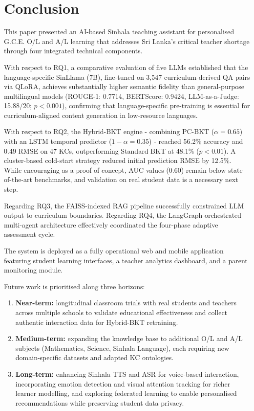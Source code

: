 \documentclass[conference]{IEEEtran}
\begin{document}
\section{Conclusion}

This paper presented an AI-based Sinhala teaching assistant for personalised G.C.E. O/L and A/L learning that addresses Sri Lanka's critical teacher shortage through four integrated technical components.

With respect to RQ1, a comparative evaluation of five LLMs established that the language-specific SinLlama (7B), fine-tuned on 3,547 curriculum-derived QA pairs via QLoRA, achieves substantially higher semantic fidelity than general-purpose multilingual models (ROUGE-1: 0.7714, BERTScore: 0.9424, LLM-as-a-Judge: 15.88/20; $p < 0.001$), confirming that language-specific pre-training is essential for curriculum-aligned content generation in low-resource languages.

With respect to RQ2, the Hybrid-BKT engine - combining PC-BKT ($\alpha = 0.65$) with an LSTM temporal predictor ($1 - \alpha = 0.35$) - reached 56.2\% accuracy and 0.49 RMSE on 47 KCs, outperforming Standard BKT at 48.1\% ($p < 0.01$). A cluster-based cold-start strategy reduced initial prediction RMSE by 12.5\%. While encouraging as a proof of concept, AUC values (0.60) remain below state-of-the-art benchmarks, and validation on real student data is a necessary next step.

Regarding RQ3, the FAISS-indexed RAG pipeline successfully constrained LLM output to curriculum boundaries. Regarding RQ4, the LangGraph-orchestrated multi-agent architecture effectively coordinated the four-phase adaptive assessment cycle.

The system is deployed as a fully operational web and mobile application featuring student learning interfaces, a teacher analytics dashboard, and a parent monitoring module.

Future work is prioritised along three horizons:

\begin{enumerate}
\item \textbf{Near-term:} longitudinal classroom trials with real students and teachers across multiple schools to validate educational effectiveness and collect authentic interaction data for Hybrid-BKT retraining.
\item \textbf{Medium-term:} expanding the knowledge base to additional O/L and A/L subjects (Mathematics, Science, Sinhala Language), each requiring new domain-specific datasets and adapted KC ontologies.
\item \textbf{Long-term:} enhancing Sinhala TTS and ASR for voice-based interaction, incorporating emotion detection and visual attention tracking for richer learner modelling, and exploring federated learning to enable personalised recommendations while preserving student data privacy.
\end{enumerate}
\end{document}
